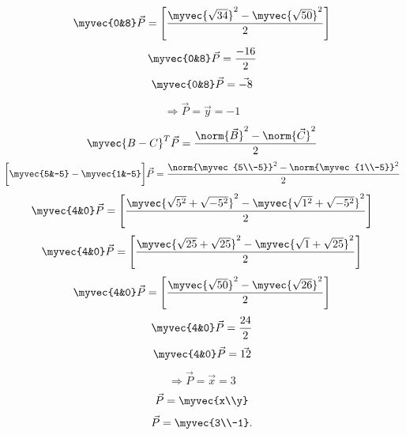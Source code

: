 \documentclass[journal,12pt,twocolumn]{IEEEtran}
\begin{document}
    \begin{align}
        \myvec{0&8}\vec{P}=\Bigg[\frac{\myvec{\sqrt{34}}^2 -\myvec{\sqrt{50}}^2}{2}\Bigg]
    \end{align}
    \begin{align}
        \myvec{0&8}\vec{P}=\frac{-16}{2}
    \end{align}
    \begin{align}
        \myvec{0&8}\vec{P}=\vec{-8}
    \end{align}
    \begin{align}
        \Longrightarrow\vec{P}=\vec{y}=-1
    \end{align}
\begin{align}
    \myvec{B-C}^T\vec{P} = \frac{\norm{\vec{B}}^2-\norm{\vec{C}}^2}{{2}}
\end{align}
\begin{align}
    \bigg[\myvec{5&-5} - \myvec{1&-5}\bigg]\vec{P} = \frac{\norm{\myvec{5\\-5}}^2-\norm{\myvec{1\\-5}}^2}{2}
\end{align}
    \begin{align}
        \myvec{4&0}\vec{P} =\Bigg[\frac{\myvec{\sqrt{5^2}+\sqrt{-5^2}}^2 -\myvec{\sqrt{1^2}+\sqrt{-5^2}}^2}{2}\Bigg]
    \end{align}
    \begin{align}
        \myvec{4&0}\vec{P}=\Bigg[\frac{\myvec{\sqrt{25}+\sqrt{25}}^2 -\myvec{\sqrt{1}+\sqrt{25}}^2}{2}\Bigg]
    \end{align}
    \begin{align}
        \myvec{4&0}\vec{P}=\Bigg[\frac{\myvec{\sqrt{50}}^2 -\myvec{\sqrt{26}}^2}{2}\Bigg]
    \end{align}
    \begin{align}
        \myvec{4&0}\vec{P}=\frac{24}{2}
    \end{align}
    \begin{align}
        \myvec{4&0}\vec{P}=\vec{12}
    \end{align}
    \begin{align}
         \Longrightarrow\vec{P}=\vec{x}=3
    \end{align}
    \begin{align}
        \Vec{P}=\myvec{x\\y}
    \end{align}
    \begin{align}
    \vec{P}=\myvec{3\\-1}.
\end{align}
\end{document}
